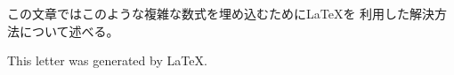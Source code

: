 \documentclass{jletteraddress}
\begin{document}
\noindent
この文章ではこのような複雑な数式を埋め込むために\LaTeX を
利用した解決方法について述べる。

\begin{flushright}
  \tiny This letter was generated by \LaTeX.
\end{flushright}




%
%
\end{document}
